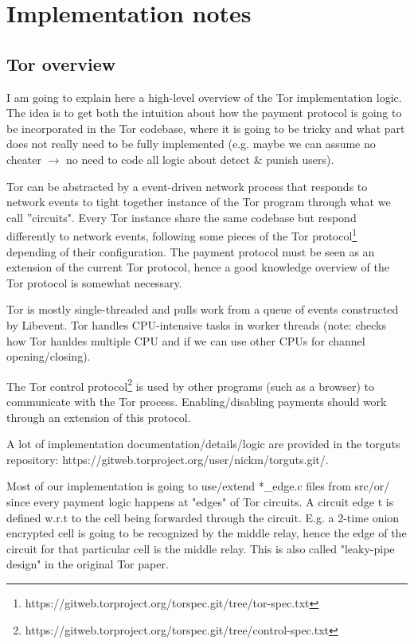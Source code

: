 \documentclass{article}
\begin{document}
\section{Implementation notes}

\subsection{Tor overview}

I am going to explain here a high-level overview of the Tor implementation logic. The idea is to get both the intuition about how the payment protocol is going to be incorporated in the Tor codebase, where it is going to be tricky and what part does not really need to be fully implemented (e.g. maybe we can assume no cheater $\rightarrow$ no need to code all logic about detect \& punish users).

Tor can be abstracted by a event-driven network process that responds to network events to tight together instance of the Tor program through what we call ''circuits". Every Tor instance share the same codebase but respond differently to network events,  following some pieces of the Tor protocol\footnote{https://gitweb.torproject.org/torspec.git/tree/tor-spec.txt} depending of their configuration. The payment protocol must be seen as an extension of the current Tor protocol, hence a good knowledge overview of the Tor protocol is somewhat necessary.

Tor is mostly single-threaded and pulls work from a queue of events constructed by Libevent. Tor handles CPU-intensive tasks in worker threads (note: checks how Tor hanldes multiple CPU and if we can use other CPUs for channel opening/closing).

The Tor control protocol\footnote{https://gitweb.torproject.org/torspec.git/tree/control-spec.txt} is used by other programs (such as a browser) to communicate with the Tor process. Enabling/disabling payments should work through an extension of this protocol.

A lot of implementation documentation/details/logic are provided in the torguts repository: https://gitweb.torproject.org/user/nickm/torguts.git/.

Most of our implementation is going to use/extend *\_edge.c files from src/or/ since every payment logic happens at "edges" of Tor circuits. A circuit edge t is defined w.r.t to the cell being forwarded through the circuit. E.g. a 2-time onion encrypted cell is going to be recognized by the middle relay, hence the edge of the circuit for that particular cell is the middle relay. This is also called "leaky-pipe design" in the original Tor paper.
\end{document}
